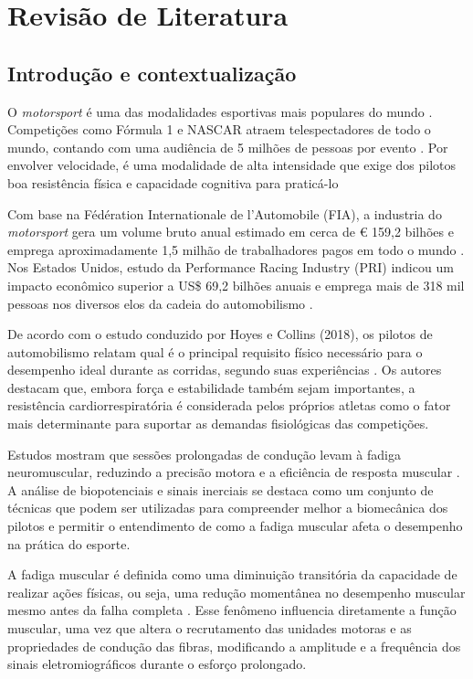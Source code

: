 \documentclass[symbols]{fei}
\begin{document}
\newpage

\section{Revisão de Literatura}
\subsection{Introdução e contextualização}

O \textit{motorsport} é uma das modalidades esportivas mais populares do mundo \cite{ferguson2015_optimizing}. Competições como Fórmula 1 e NASCAR 
atraem telespectadores de todo o mundo, contando com uma audiência de 5 milhões de pessoas por evento \cite{ferguson2015_optimizing}. Por envolver 
velocidade, é uma modalidade de alta intensidade que exige dos pilotos boa resistência física e capacidade cognitiva para 
praticá-lo \cite{ferguson2007_reactivity}

Com base na Fédération Internationale de l'Automobile (FIA), a industria do \textit{motorsport} gera um volume bruto anual estimado 
em cerca de € 159,2 bilhões e emprega aproximadamente 1,5 milhão de trabalhadores pagos em todo o mundo \cite{fia_impact_2021}. Nos 
Estados Unidos, estudo da Performance Racing Industry (PRI) indicou um impacto econômico superior a US\$ 69,2 bilhões anuais e emprega 
mais de 318 mil pessoas nos diversos elos da cadeia do automobilismo \cite{pri_study_2025}.

De acordo com o estudo conduzido por Hoyes e Collins (2018), os pilotos de automobilismo relatam qual é o 
principal requisito físico necessário para o desempenho ideal durante as corridas, segundo suas experiências \cite{fittorace}. 
Os autores destacam que, embora força e estabilidade também sejam importantes, a resistência cardiorrespiratória é considerada pelos 
próprios atletas como o fator mais determinante para suportar as demandas fisiológicas das competições.

Estudos mostram que sessões prolongadas de condução levam à fadiga neuromuscular, reduzindo a precisão motora e 
a eficiência de resposta muscular \cite{lecocq2020neuromuscular}. A análise de biopotenciais e sinais inerciais 
se destaca como um conjunto de técnicas que podem ser utilizadas para compreender melhor a biomecânica dos pilotos e permitir o 
entendimento  de como a fadiga muscular afeta o desempenho na prática do esporte. 

A fadiga muscular é definida como uma diminuição transitória da capacidade de realizar ações físicas, ou seja, uma redução momentânea no desempenho 
muscular mesmo antes da falha completa \cite{enoka2007_muscle_fatigue}. Esse fenômeno influencia diretamente a função muscular, uma vez que altera o 
recrutamento das unidades motoras e as propriedades de condução das fibras, modificando a amplitude e a frequência dos sinais eletromiográficos durante o esforço prolongado.
\end{document}
